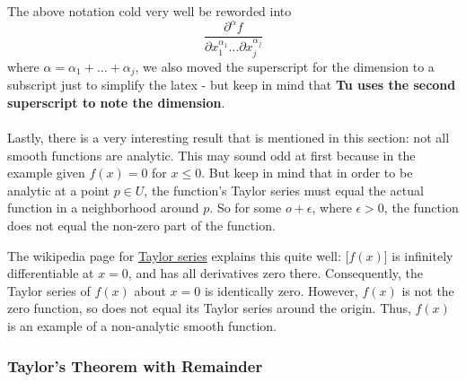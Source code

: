 The above notation cold very well be reworded into
$$
\frac{\partial^\alpha f}{\partial x^{\alpha_1}_{1} \ldots \partial x^{\alpha_j}_{j}}
$$
where $\alpha = \alpha_1 + \ldots + \alpha_j$, we also moved the superscript for the dimension to a subscript just
to simplify the latex - but keep in mind that \textbf{Tu uses the second superscript to note the dimension}.
\\~\\



Lastly, there is a very interesting result that is mentioned in this section:
not all smooth functions are analytic.
This may sound odd at first because in the example given $f(x) = 0$ for $x \leq 0$.
But keep in mind that in order to be analytic at a point $p \in U$, the function's Taylor series must equal
the actual function in a neighborhood around $p$.
So for some $o+\epsilon$, where $\epsilon >0$, the function does not equal the non-zero part of the function.

The wikipedia page for \href{https://en.wikipedia.org/wiki/Taylor_series}{Taylor series}
explains this quite well:
[$f(x)$] is infinitely differentiable at $x = 0$, and has all derivatives zero there.
Consequently, the Taylor series of $f(x)$ about $x = 0$ is identically zero.
However, $f(x)$ is not the zero function, so does not equal its Taylor series around the origin.
Thus, $f(x)$ is an example of a non-analytic smooth function.





\subsubsection{Taylor's Theorem with Remainder}